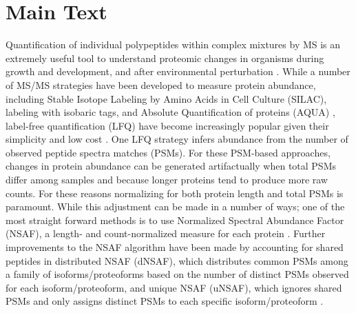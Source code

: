 \section{Main Text}
Quantification of individual polypeptides within complex mixtures by MS is an extremely useful tool to understand proteomic changes in organisms during growth and development, and after environmental perturbation \citep{wong10}.
While a number of MS/MS strategies have been developed to measure protein abundance, including Stable Isotope Labeling by Amino Acids in Cell Culture (SILAC), labeling with isobaric tags, and Absolute Quantification of proteins (AQUA) \citep{gerber03, ong02, ross04, thompson03}, label-free quantification (LFQ) have become increasingly popular given their simplicity and low cost \citep{wong10, zhang06}.
One LFQ strategy infers abundance from the number of observed peptide spectra matches (PSMs).
For these PSM-based approaches, changes in protein abundance can be generated artifactually when total PSMs differ among samples and because longer proteins tend to produce more raw counts.
For these reasons normalizing for both protein length and total PSMs is paramount.
While this adjustment can be made in a number of ways; one of the most straight forward methods is to use Normalized Spectral Abundance Factor (NSAF), a length- and count-normalized measure for each protein \citep{zybailov06}.
Further improvements to the NSAF algorithm have been made by accounting for shared peptides in distributed NSAF (dNSAF), which distributes common PSMs among a family of isoforms/proteoforms based on the number of distinct PSMs observed for each isoform/proteoform, and unique NSAF (uNSAF), which ignores shared PSMs and only assigns distinct PSMs to each specific isoform/proteoform \citep{zhang10}.

